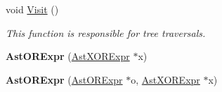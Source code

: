 \begin{DoxyCompactItemize}
\item 
void \hyperlink{classAstORExpr_ac442067b01450413dca857727b3af8b3}{Visit} ()
\begin{DoxyCompactList}\small\item\em This function is responsible for tree traversals. \end{DoxyCompactList}\item 
\hypertarget{classAstORExpr_a7e7557c1813587fa1a442cb7b5c5317c}{{\bfseries Ast\-O\-R\-Expr} (\hyperlink{classAstXORExpr}{Ast\-X\-O\-R\-Expr} $\ast$x)}\label{classAstORExpr_a7e7557c1813587fa1a442cb7b5c5317c}

\item 
\hypertarget{classAstORExpr_a928d0f31c99cd5d9eef962544465df7e}{{\bfseries Ast\-O\-R\-Expr} (\hyperlink{classAstORExpr}{Ast\-O\-R\-Expr} $\ast$o, \hyperlink{classAstXORExpr}{Ast\-X\-O\-R\-Expr} $\ast$x)}\label{classAstORExpr_a928d0f31c99cd5d9eef962544465df7e}


\end{DoxyCompactItemize}
